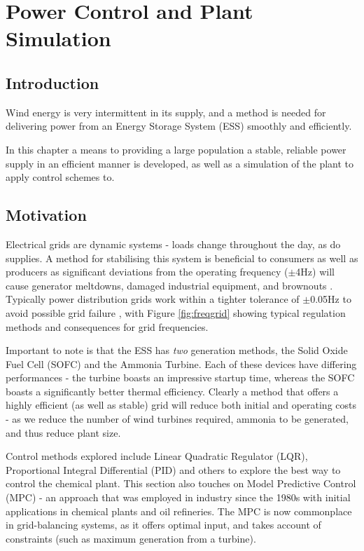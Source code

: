 
\section{Power Control and Plant Simulation}
\label{sec:powercontrol}
\subsection{Introduction}
\label{sec:pwrintro}

Wind energy is very intermittent in its supply, and a method is needed for delivering power from an Energy Storage System (ESS) smoothly and efficiently.

In this chapter a means to providing a large population a stable, reliable power supply in an efficient manner is developed, as well as a simulation of the plant to apply control schemes to.

\subsection{Motivation}

Electrical grids are dynamic systems - loads change throughout the day, as do supplies.
A method for stabilising this system is beneficial to consumers as well as producers as significant deviations from the operating frequency ($\pm$4Hz) will cause generator meltdowns, damaged industrial equipment, and brownouts \cite{power:freqs}.
Typically power distribution grids work within a tighter tolerance of $\pm$0.05Hz to avoid possible grid failure \cite{power:freqs}, with Figure \ref{fig:freqgrid} showing typical regulation methods and consequences for grid frequencies.

Important to note is that the ESS has \emph{two} generation methods, the Solid Oxide Fuel Cell (SOFC) and the Ammonia Turbine.
Each of these devices have differing performances - the turbine boasts an impressive startup time, whereas the SOFC boasts a significantly better thermal efficiency.
Clearly a method that offers a highly efficient (as well as stable) grid will reduce both initial and operating costs - as we reduce the number of wind turbines required, ammonia to be generated, and thus reduce plant size.

Control methods explored include Linear Quadratic Regulator (LQR), Proportional Integral Differential (PID) and others to explore the best way to control the chemical plant. This section also touches on Model Predictive Control (MPC) - an approach that was employed in industry since the 1980s with initial applications in chemical plants and oil refineries.
The MPC is now commonplace in grid-balancing systems, as it offers optimal input, and takes account of constraints (such as maximum generation from a turbine). \cite{power:mpcadvs}

